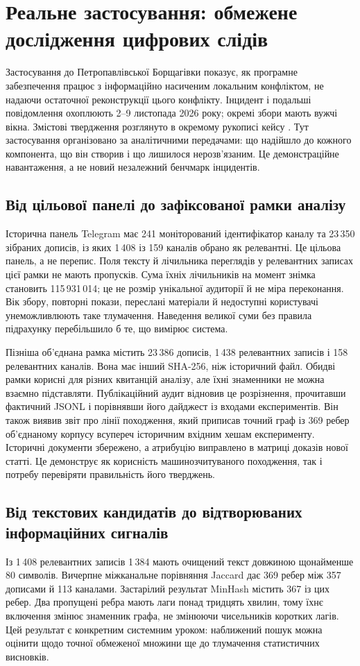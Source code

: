 \section{Реальне застосування: обмежене дослідження цифрових слідів}
\label{sec:application}
Застосування до Петропавлівської Борщагівки показує, як програмне забезпечення працює з інформаційно насиченим локальним конфліктом, не надаючи остаточної реконструкції цього конфлікту. Інцидент і подальші повідомлення охоплюють 2--9 листопада 2026 року; окремі збори мають вужчі вікна. Змістові твердження розглянуто в окремому рукописі кейсу \citep{pylypenko2026case}. Тут застосування організовано за аналітичними передачами: що надійшло до кожного компонента, що він створив і що лишилося нерозв'язаним. Це демонстраційне навантаження, а не новий незалежний бенчмарк інцидентів.

\subsection{Від цільової панелі до зафіксованої рамки аналізу}
Історична панель Telegram має 241 моніторований ідентифікатор каналу та 23\,350 зібраних дописів, із яких 1\,408 із 159 каналів обрано як релевантні. Це цільова панель, а не перепис. Поля тексту й лічильника переглядів у релевантних записах цієї рамки не мають пропусків. Сума їхніх лічильників на момент знімка становить 115\,931\,014; це не розмір унікальної аудиторії й не міра переконання. Вік збору, повторні покази, переслані матеріали й недоступні користувачі унеможливлюють таке тлумачення. Наведення великої суми без правила підрахунку перебільшило б те, що вимірює система.

Пізніша об'єднана рамка містить 23\,386 дописів, 1\,438 релевантних записів і 158 релевантних каналів. Вона має інший SHA-256, ніж історичний файл. Обидві рамки корисні для різних квитанцій аналізу, але їхні знаменники не можна взаємно підставляти. Публікаційний аудит відновив це розрізнення, прочитавши фактичний JSONL і порівнявши його дайджест із входами експериментів. Він також виявив звіт про лінії походження, який приписав точний граф із 369 ребер об'єднаному корпусу всупереч історичним вхідним хешам експерименту. Історичні документи збережено, а атрибуцію виправлено в матриці доказів нової статті. Це демонструє як корисність машинозчитуваного походження, так і потребу перевіряти правильність його тверджень.

\subsection{Від текстових кандидатів до відтворюваних інформаційних сигналів}
Із 1\,408 релевантних записів 1\,384 мають очищений текст довжиною щонайменше 80 символів. Вичерпне міжканальне порівняння Jaccard дає 369 ребер між 357 дописами й 113 каналами. Застарілий результат MinHash містить 367 із цих ребер. Два пропущені ребра мають лаги понад тридцять хвилин, тому їхнє включення змінює знаменник графа, не змінюючи чисельників коротких лагів. Цей результат є конкретним системним уроком: наближений пошук можна оцінити щодо точної обмеженої множини ще до тлумачення статистичних висновків.

